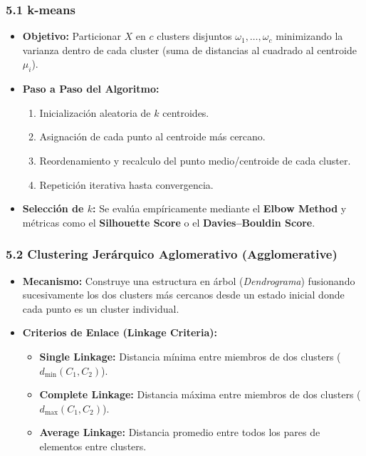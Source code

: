\subsubsection{5.1 k-means}

\begin{itemize}
	\item \textbf{Objetivo:} Particionar $X$ en $c$ clusters disjuntos $\omega_1, \dots, \omega_c$ minimizando la varianza dentro de cada cluster (suma de distancias al cuadrado al centroide $\mu_i$).
	
	\item \textbf{Paso a Paso del Algoritmo:}
	\begin{enumerate}
		\item Inicialización aleatoria de $k$ centroides.
		\item Asignación de cada punto al centroide más cercano.
		\item Reordenamiento y recalculo del punto medio/centroide de cada cluster.
		\item Repetición iterativa hasta convergencia.
	\end{enumerate}
	
	\item \textbf{Selección de $k$:} Se evalúa empíricamente mediante el \textbf{Elbow Method} y métricas como el \textbf{Silhouette Score} o el \textbf{Davies–Bouldin Score}.
\end{itemize}

\subsubsection{5.2 Clustering Jerárquico Aglomerativo (Agglomerative)}

\begin{itemize}
	\item \textbf{Mecanismo:} Construye una estructura en árbol (\emph{Dendrograma}) fusionando sucesivamente los dos clusters más cercanos desde un estado inicial donde cada punto es un cluster individual.
	
	\item \textbf{Criterios de Enlace (Linkage Criteria):}
	\begin{itemize}
		\item \textbf{Single Linkage:} Distancia mínima entre miembros de dos clusters ($d_{\min}(C_1, C_2)$).
		\item \textbf{Complete Linkage:} Distancia máxima entre miembros de dos clusters ($d_{\max}(C_1, C_2)$).
		\item \textbf{Average Linkage:} Distancia promedio entre todos los pares de elementos entre clusters.
	\end{itemize}
\end{itemize}

